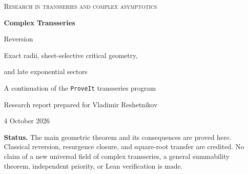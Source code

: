 \documentclass[11pt,a4paper]{article}
\numberwithin{equation}{section}
\theoremstyle{definition}
\theoremstyle{remark}
\newcommand{\e}{\mathrm e}
\newcommand{\repo}{\texttt{ProveIt}}
\begin{document}
\hypersetup{pageanchor=false}
\begin{titlepage}
\color{ink}
\vspace*{12mm}
{\large\scshape Research in transseries and complex asymptotics\par}
\vspace{12mm}
{\fontsize{29}{34}\selectfont\bfseries Complex Transseries\par Reversion\par}
\vspace{7mm}
{\Large Exact radii, sheet-selective critical geometry,\par and late exponential sectors\par}
\vspace{13mm}
{\large A continuation of the \repo{} transseries program\par}
\vspace{4mm}
{Research report prepared for Vladimir Reshetnikov\par 4 October 2026\par}
\vspace{12mm}
\color{black}
\begin{abstract}
Series reversion on the complex plane requires more information than a formal list of transmonomials: a compatible substitution chart, an analytic realization, and a selected inverse sheet. We develop these layers separately and prove a quantitative result connecting them. If
\[
 Q(s)=-s\exp(s+V(s)),\qquad V(0)=0,
 \qquad \sup_{|s|\leq1+\delta}|V(s)|\leq\frac{\delta^2}{1000},
\]
where $0<\delta\leq\tfrac12$, then the inverse germ $s(0)=0$ has exactly one singularity on its circle of convergence. It is the simple critical value near $\e^{-1}$, and the radius is its modulus, even for complex-valued perturbations without coefficient positivity. The proof uses a circle through the perturbed critical point on which $|Q|$ has a unique minimum.

This determines the exact radius in a sufficiently large-core regime left unresolved in an inspected \repo{} report. It also gives all-order late-sector asymptotics, a boundary truncation law, and a double-scaling law showing how a small curvature correction changes high-order sectors by an order-one factor. A fully explicit entire example has a critical value on another sheet more than $10^{1081}$ times closer to the origin than the selected branch's convergence radius. We extend the normalization to nonlinear exponential actions and analytic prefactors, explain sectorial and Stokes gluing, and provide exact symbolic checks and high-precision diagnostics.
\end{abstract}
\vfill
\noindent\small\textbf{Status.} The main geometric theorem and its consequences are proved here. Classical reversion, resurgence closure, and square-root transfer are credited. No claim of a new universal field of complex transseries, a general summability theorem, independent priority, or Lean verification is made.
\end{titlepage}
\hypersetup{pageanchor=true}
\begingroup
\small
\setlength{\parskip}{0pt}
\tableofcontents
\endgroup
\newpage
{}
\end{document}
